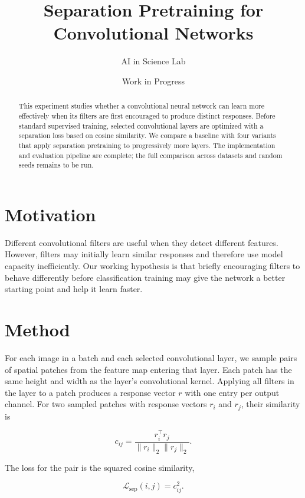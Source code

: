 \documentclass[11pt]{article}
\title{Separation Pretraining for Convolutional Networks}
\author{AI in Science Lab}
\date{Work in Progress}
\begin{document}
\maketitle

\begin{abstract}
This experiment studies whether a convolutional neural network can learn more
effectively when its filters are first encouraged to produce distinct
responses. Before standard supervised training, selected convolutional layers
are optimized with a separation loss based on cosine similarity. We compare a
baseline with four variants that apply separation pretraining to progressively
more layers. The implementation and evaluation pipeline are complete; the
full comparison across datasets and random seeds remains to be run.
\end{abstract}

\section{Motivation}

Different convolutional filters are useful when they detect different
features.  However, filters may initially learn similar responses and therefore
use model capacity inefficiently.  Our working hypothesis is that briefly
encouraging filters to behave differently before classification training may
give the network a better starting point and help it learn faster.

\section{Method}

For each image in a batch and each selected convolutional layer, we sample
pairs of spatial patches from the feature map entering that layer. Each patch
has the same height and width as the layer's convolutional kernel. Applying all
filters in the layer to a patch produces a response vector $r$ with one entry
per output channel. For two sampled patches with response vectors $r_i$ and
$r_j$, their similarity is

\begin{equation}
    c_{ij} = \frac{r_i^\top r_j}
    {\lVert r_i \rVert_2\lVert r_j \rVert_2}.
\end{equation}

The loss for the pair is the squared cosine similarity,

\begin{equation}
    \mathcal{L}_{\mathrm{sep}}(i,j) = c_{ij}^{2}.
\end{equation}
\end{document}
